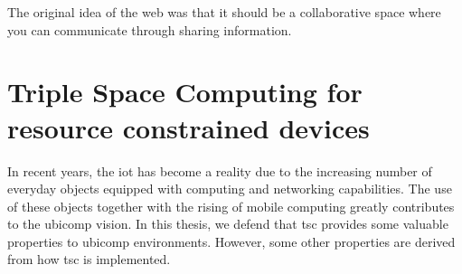 
\begin{savequote}[50mm]
The original idea of the web was that it should be a collaborative space where you can communicate through sharing information.
\end{savequote}


\newcommand{\codigo}[1]{``\texttt{#1}''}
\newcommand{\primquery}{\emph{query}}
\newcommand{\primread}{\emph{read}}
\newcommand{\primtake}{\emph{take}}
\newcommand{\primwrite}{\emph{write}}


\chapter{Triple Space Computing for resource constrained devices}
\label{cha:tsc}
\newcommand{\pathchapthree}{3_tsc}

\ifpdf
    \graphicspath{{\pathchapthree/figures/PNG/}{\pathchapthree/figures/PDF/}{\pathchapthree/figures/}}
\else
    \graphicspath{{\pathchapthree/figures/EPS/}{\pathchapthree/figures/}}
\fi









In recent years, the \acf{iot} has become a reality due to the increasing number of everyday objects equipped with computing and networking capabilities.
The use of these objects together with the rising of mobile computing greatly contributes to the \ac{ubicomp} vision.
In this thesis, we defend that \acf{tsc} provides some valuable properties to \ac{ubicomp} environments. %
However, some other properties are derived from how \ac{tsc} is implemented. %


